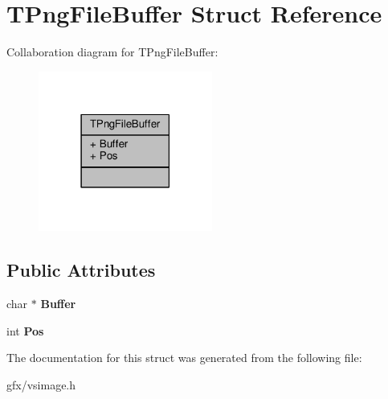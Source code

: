 \hypertarget{structTPngFileBuffer}{}\section{T\+Png\+File\+Buffer Struct Reference}
\label{structTPngFileBuffer}


Collaboration diagram for T\+Png\+File\+Buffer\+:
\nopagebreak
\begin{figure}[H]
\begin{center}
\leavevmode
\includegraphics[width=162pt]{de/d91/structTPngFileBuffer__coll__graph}
\end{center}
\end{figure}
\subsection*{Public Attributes}
\begin{DoxyCompactItemize}
\item 
char $\ast$ {\bfseries Buffer}\hypertarget{structTPngFileBuffer_a3f8890bcddf62a2eafb602f280150e28}{}\label{structTPngFileBuffer_a3f8890bcddf62a2eafb602f280150e28}

\item 
int {\bfseries Pos}\hypertarget{structTPngFileBuffer_a89a2fc2aa5524e61cf7103dc4e472c97}{}\label{structTPngFileBuffer_a89a2fc2aa5524e61cf7103dc4e472c97}

\end{DoxyCompactItemize}


The documentation for this struct was generated from the following file\+:\begin{DoxyCompactItemize}
\item 
gfx/vsimage.\+h\end{DoxyCompactItemize}
